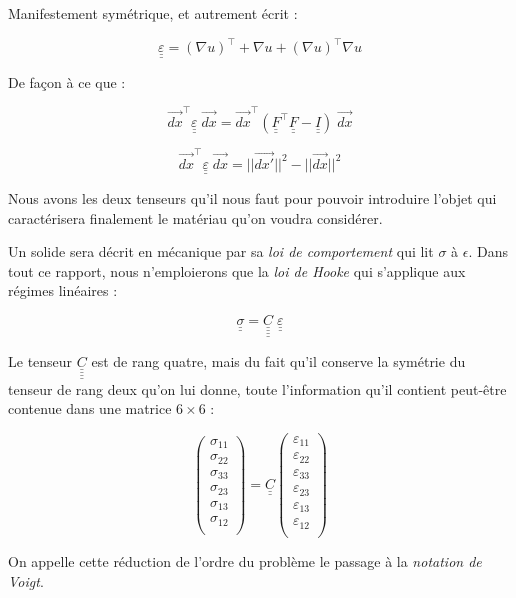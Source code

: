 \documentclass{article}
\begin{document}
Manifestement symétrique, et autrement écrit :

\[
\underline{\underline{\varepsilon}} = (\nabla u)^\top + \nabla u + (\nabla u)^\top\nabla u
\]

De façon à ce que :

\[
\vec{dx}^\top \underline{\underline{\varepsilon}} \; \vec{dx} = \vec{dx}^\top (\underline{\underline{F}}^\top\underline{\underline{F}}-\underline{\underline{I}}) \; \vec{dx}
\]

\[
\vec{dx}^\top \underline{\underline{\varepsilon}} \; \vec{dx} = ||\vec{dx'}||^2 -||\vec{dx}||^2
\]

Nous avons les deux tenseurs qu'il nous faut pour pouvoir introduire l'objet qui caractérisera finalement le matériau qu'on voudra considérer.

Un solide sera décrit en mécanique par sa \emph{loi de comportement} qui lit $\sigma$ à $\epsilon$. Dans tout ce rapport, nous n'emploierons que la \emph{loi de Hooke} qui s'applique aux régimes linéaires :

\[
\underline{\underline{\sigma}}=\underline{\underline{\underline{\underline{C}}}}\;
\underline{\underline{\varepsilon}}
\]

Le tenseur $\underline{\underline{\underline{\underline{C}}}}$ est de rang quatre, mais du fait qu'il conserve la symétrie du tenseur de rang deux qu'on lui donne, toute l'information qu'il contient peut-être contenue dans une matrice $6\times 6$ :

\[
\left(\begin{matrix}
\sigma_{11} \\ \sigma_{22} \\ \sigma_{33} \\ \sigma_{23} \\ \sigma_{13} \\ \sigma_{12} \\\end{matrix}\right) = \underline{\underline{C}}
\left(\begin{matrix}
\varepsilon_{11} \\ \varepsilon_{22} \\ \varepsilon_{33} \\ \varepsilon_{23} \\ \varepsilon_{13} \\ \varepsilon_{12} \\\end{matrix}\right)
\]

On appelle cette réduction de l'ordre du problème le passage à la \emph{notation de Voigt}.
\end{document}
